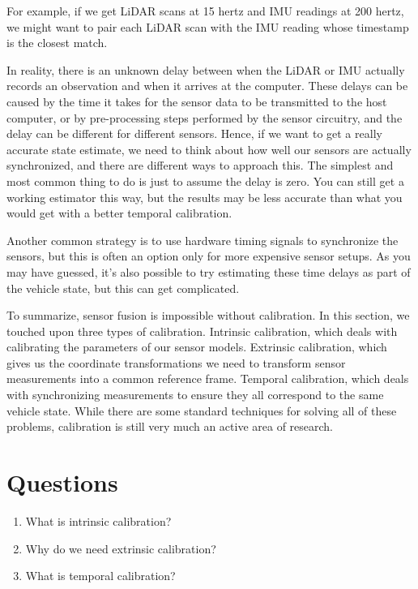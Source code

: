 For example, if we get LiDAR scans at 15 hertz and IMU
readings at 200 hertz, we might want to pair
each LiDAR scan with the IMU reading
whose timestamp is the closest match. 


In reality, there is an unknown delay
between when the LiDAR or IMU actually records an observation and when it arrives at
the computer. These delays can be caused by the time it takes for the sensor data to be transmitted to
the host computer, or by pre-processing steps performed by
the sensor circuitry, and the delay
can be different for different sensors. Hence, if we want to get a really accurate
state estimate, we need to think about how well our sensors are
actually synchronized, and there are different ways to approach this. The simplest and most
common thing to do is just to assume
the delay is zero. You can still get a working estimator
this way, but the results may be less accurate than
what you would get with a better temporal calibration. 

Another common strategy is to use hardware timing signals to synchronize
the sensors, but this is often
an option only for more expensive sensor setups. As you may have guessed, it's also possible
to try estimating these time delays as part of the vehicle state, but this can get
complicated.


To summarize,
sensor fusion is impossible
without calibration. In this section, we touched upon three types of calibration.
Intrinsic calibration, which deals with
calibrating the parameters of
our sensor models. Extrinsic calibration,
which gives us the coordinate
transformations we need to transform
sensor measurements into a common
reference frame. Temporal calibration, which deals with
synchronizing measurements to
ensure they all correspond to
the same vehicle state. While there are some standard
techniques for solving all of
these problems, calibration is still very much an active area
of research. 

\section{Questions}

\begin{enumerate}
\item What is intrinsic calibration?
\item Why do we need extrinsic calibration?
\item What is temporal calibration?
\end{enumerate}
